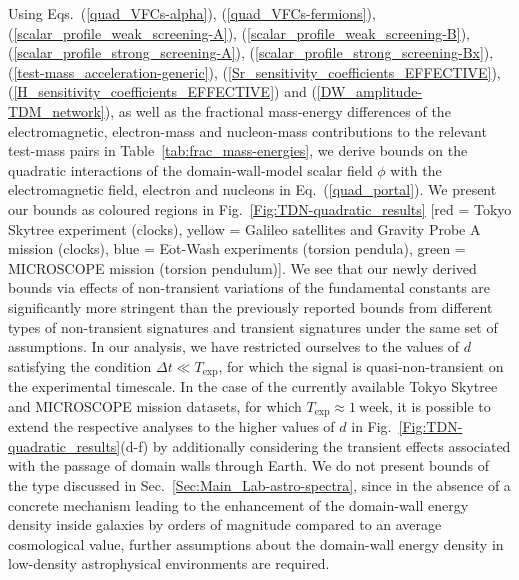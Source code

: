 \documentclass[aps,prd,onecolumn,nofootinbib]{revtex4-2} %
\begin{document}
Using Eqs.~(\ref{quad_VFCs-alpha}), (\ref{quad_VFCs-fermions}), (\ref{scalar_profile_weak_screening-A}), (\ref{scalar_profile_weak_screening-B}), (\ref{scalar_profile_strong_screening-A}), (\ref{scalar_profile_strong_screening-Bx}), (\ref{test-mass_acceleration-generic}), (\ref{Sr_sensitivity_coefficients_EFFECTIVE}), (\ref{H_sensitivity_coefficients_EFFECTIVE}) and (\ref{DW_amplitude-TDM_network}), as well as the fractional mass-energy differences of the electromagnetic, electron-mass and nucleon-mass contributions to the relevant test-mass pairs in Table~\ref{tab:frac_mass-energies}, we derive bounds on the quadratic interactions of the domain-wall-model scalar field $\phi$ with the electromagnetic field, electron and nucleons in Eq.~(\ref{quad_portal}). 
We present our bounds as coloured regions in Fig.~\ref{Fig:TDN-quadratic_results} [red = Tokyo Skytree experiment (clocks), yellow = Galileo satellites and Gravity Probe A mission (clocks), blue = E$\ddot{\textrm{o}}$t-Wash experiments (torsion pendula), green = MICROSCOPE mission (torsion pendulum)]. 
We see that our newly derived bounds via effects of non-transient variations of the fundamental constants are significantly more stringent than the previously reported bounds from different types of non-transient signatures and transient signatures under the same set of assumptions. 
In our analysis, we have restricted ourselves to the values of $d$ satisfying the condition $\Delta t \ll T_\textrm{exp}$, for which the signal is quasi-non-transient on the experimental timescale. 
In the case of the currently available Tokyo Skytree and MICROSCOPE mission datasets, for which $T_\textrm{exp} \approx 1~\textrm{week}$, it is possible to extend the respective analyses to the higher values of $d$ in Fig.~\ref{Fig:TDN-quadratic_results}(d-f) by additionally considering the transient effects associated with the passage of domain walls through Earth. 
We do not present bounds of the type discussed in Sec.~\ref{Sec:Main_Lab-astro-spectra}, since in the absence of a concrete mechanism leading to the enhancement of the domain-wall energy density inside galaxies by orders of magnitude compared to an average cosmological value, further assumptions about the domain-wall energy density in low-density astrophysical environments are required. 
\end{document}
